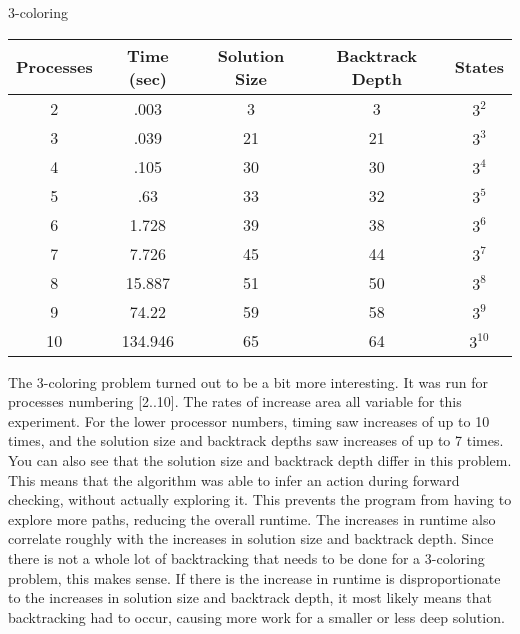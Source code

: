 \begin{center}
3-coloring \\
\begin{tabular}{|c|c|c|c|c|}
\hline
 Processes & Time (sec) & Solution Size & Backtrack Depth & States \\
\hline
 2 & .003 & 3 & 3 & $3^{2}$           \\
 3 & .039 & 21 & 21 & $3^{3}$         \\
 4 & .105 & 30 & 30 & $3^{4}$          \\
 5 & .63 & 33 & 32 & $3^{5}$          \\
 6 & 1.728 & 39 & 38 & $3^{6}$        \\
 7 & 7.726 & 45 & 44 & $3^{7}$        \\
 8 & 15.887 & 51 & 50 & $3^{8}$       \\
 9 & 74.22 & 59 & 58 & $3^{9}$        \\
 10 & 134.946 & 65 & 64 & $3^{10}$    \\
\hline
\end{tabular}
\end{center}

The 3-coloring problem turned out to be a bit more interesting.  It was run for processes numbering [2..10].  The rates of increase area all variable
for this experiment.  For the lower processor numbers, timing saw increases of up to 10 times, and the solution size and backtrack depths saw increases
of up to 7 times.  You can also see that the solution size and backtrack depth differ in this problem.  This means that the algorithm was able to infer
an action during forward checking, without actually exploring it.  This prevents the program from having to explore more paths, reducing the overall
runtime.  The increases in runtime also correlate roughly with the increases in solution size and backtrack depth.  Since there is not a whole lot
of backtracking that needs to be done for a 3-coloring problem, this makes sense.  If there is the increase in runtime is disproportionate to the
increases in solution size and backtrack depth, it most likely means that backtracking had to occur, causing more work for a smaller or less deep
solution.

\newpage

